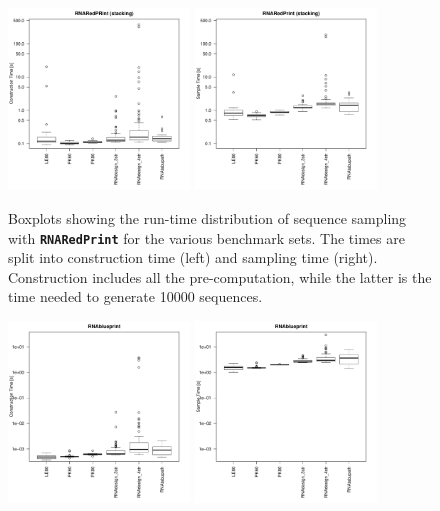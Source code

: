 \documentclass[10pt]{article}
\newcommand{\ourprog}{{\tt \bfseries{}\color{black!85}RNA\textcolor{red!70!black}{Red}Print}}
\newenvironment{revision}{\color{red}}{\color{black}}
\begin{document}
\begin{revision}
\begin{figure}[h!]
  \centering
  \includegraphics[width=0.43\textwidth]{Figs/RunTimes/construction_time_sets}\quad%
  \includegraphics[width=0.43\textwidth]{Figs/RunTimes/sample_time_sets}
  \caption{Boxplots showing the run-time distribution of sequence sampling with \ourprog{} for the various benchmark sets. The times are split into construction time (left) and sampling time (right). Construction includes all the pre-computation, while the latter is the time needed to generate 10000 sequences. }
  \label{appfig:run-times-redprint}
\end{figure}
\begin{figure}[h!]
  \centering
  \includegraphics[width=0.43\textwidth]{Figs/RunTimes/construction_time_sets_rbp}\quad%
  \includegraphics[width=0.43\textwidth]{Figs/RunTimes/sample_time_sets_rbp}

\end{figure}
\end{revision}
\end{document}
